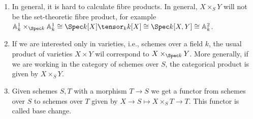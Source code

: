 \begin{enumerate}
	\item In general, it is hard to calculate fibre products. In general,
		$X\times_S Y$ will not be the set-theoretic fibre product, for example
		$\mathbb{A}_k^1\times_{\Spec k}\mathbb{A}_k^1 \cong \Spec k[X]\tensor_k k[X] \cong \Spec k[X, Y] \cong \mathbb{A}_k^2 $.
	\item If we are interested only in varieties, i.e., schemes over a field $k$, the usual
		product of varieties $X\times Y$ wil correspond to $X\times_{\Spec k} Y$.
		More generally, if we are working in the category of schemes over $S$, the
		categorical product is given by $X\times_S Y$.
	\item Given schemes $S, T$ with a morphism $T\to S$ we get a functor from schemes
		over $S$ to schemes over $T$ given by $X\to S\mapsto X\times_S T\to T$. This
		functor is called base change.
\end{enumerate}
